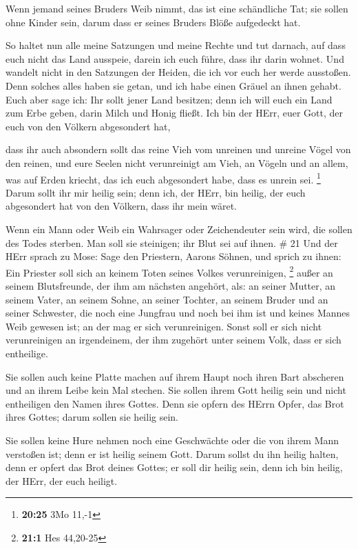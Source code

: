  Wenn jemand seines Bruders Weib nimmt, das ist eine
schändliche Tat; sie sollen ohne Kinder sein, darum dass er seines
Bruders Blöße aufgedeckt hat.

 So haltet nun alle meine Satzungen und meine Rechte und
tut darnach, auf dass euch nicht das Land ausspeie, darein ich euch
führe, dass ihr darin wohnet.  Und wandelt nicht in den
Satzungen der Heiden, die ich vor euch her werde ausstoßen. Denn solches
alles haben sie getan, und ich habe einen Gräuel an ihnen gehabt.
 Euch aber sage ich: Ihr sollt jener Land besitzen; denn
ich will euch ein Land zum Erbe geben, darin Milch und Honig fließt. Ich
bin der HErr, euer Gott, der euch von den Völkern abgesondert hat,

 dass ihr auch absondern sollt das reine Vieh vom unreinen
und unreine Vögel von den reinen, und eure Seelen nicht verunreinigt am
Vieh, an Vögeln und an allem, was auf Erden kriecht, das ich euch
abgesondert habe, dass es unrein sei. \footnote{\textbf{20:25} 3Mo 11,-1}
 Darum sollt ihr mir heilig sein; denn ich, der HErr, bin
heilig, der euch abgesondert hat von den Völkern, dass ihr mein wäret.

 Wenn ein Mann oder Weib ein Wahrsager oder Zeichendeuter
sein wird, die sollen des Todes sterben. Man soll sie steinigen; ihr
Blut sei auf ihnen. \# 21  Und der HErr sprach zu Mose: Sage
den Priestern, Aarons Söhnen, und sprich zu ihnen: Ein Priester soll
sich an keinem Toten seines Volkes verunreinigen, \footnote{\textbf{21:1}
  Hes 44,20-25}  außer an seinem Blutsfreunde, der ihm am
nächsten angehört, als: an seiner Mutter, an seinem Vater, an seinem
Sohne, an seiner Tochter, an seinem Bruder  und an seiner
Schwester, die noch eine Jungfrau und noch bei ihm ist und keines Mannes
Weib gewesen ist; an der mag er sich verunreinigen.  Sonst
soll er sich nicht verunreinigen an irgendeinem, der ihm zugehört unter
seinem Volk, dass er sich entheilige.

 Sie sollen auch keine Platte machen auf ihrem Haupt noch
ihren Bart abscheren und an ihrem Leibe kein Mal stechen. 
Sie sollen ihrem Gott heilig sein und nicht entheiligen den Namen ihres
Gottes. Denn sie opfern des HErrn Opfer, das Brot ihres Gottes; darum
sollen sie heilig sein.

 Sie sollen keine Hure nehmen noch eine Geschwächte oder die
von ihrem Mann verstoßen ist; denn er ist heilig seinem Gott.
 Darum sollst du ihn heilig halten, denn er opfert das Brot
deines Gottes; er soll dir heilig sein, denn ich bin heilig, der HErr,
der euch heiligt.

